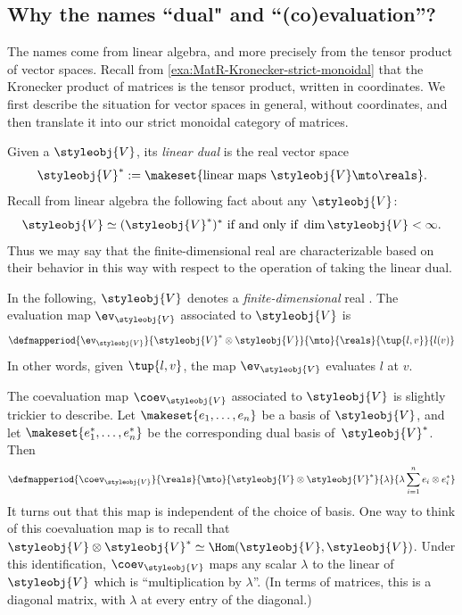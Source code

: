 \subsection{Why the names ``dual" and ``(co)evaluation''?}

The names come from linear algebra, and more precisely from the tensor product of vector spaces.
Recall from \cref{exa:MatR-Kronecker-strict-monoidal} that the Kronecker product of matrices is the tensor product, written in coordinates.
We first describe the situation for vector spaces in general, without coordinates, and then translate it into our strict monoidal category of matrices.

Given a  $\styleobj{V} $, its \emph{linear dual} is the real vector space
\begin{equation}
    \label{eq:lin-dual-vecsp}
    \styleobj{V} ^{*} := \makeset{ \text{linear maps } \styleobj{V} \mto \reals }.
\end{equation}
%
Recall from linear algebra the following fact about any  $\styleobj{V} $:
%
\begin{equation}
    \label{eq:double-dual-fin-dim}
    \styleobj{V} \simeq (\styleobj{V} ^{*})^* \text{ if and only if } \dim \styleobj{V} < \infty.
\end{equation}
%
Thus we may say that the finite-dimensional real  are characterizable based on their behavior in this way with respect to the operation of taking the linear dual. 


In the following, $\styleobj{V} $ denotes a \emph{finite-dimensional} real .
The evaluation map $\ev_\styleobj{V} $ associated to $\styleobj{V} $ is
\begin{equation}
    \label{eq:evaluation-vecsp}
    \defmapperiod{
        \ev_\styleobj{V}
    }{
        \styleobj{V}^* \otimes \styleobj{V}
    }{
        \mto
    }{
        \reals
    }{
        \tup{l, v}
    }{
        l(v)
    }
\end{equation}
In other words, given $\tup{l, v}$, the map $\ev_\styleobj{V} $ evaluates $l$ at $v$.

The coevaluation map $\coev_\styleobj{V} $ associated to $\styleobj{V} $ is slightly trickier to describe.
Let $\makeset{e_1, \dots, e_n }$ be a basis of $\styleobj{V}$, and let $\makeset{e_1^*, \dots, e_n^* }$ be the corresponding dual basis of~$\styleobj{V}^*$.
Then
\begin{equation}
    \label{eq:coevaluation-vecsp}
    \defmapperiod{
        \coev_\styleobj{V}
    }{
        \reals
    }{
        \mto
    }{
        \styleobj{V} \otimes \styleobj{V}^*
    }{
        \lambda
    }{
        \lambda \sum_{i=1}^n e_i \otimes e_i^*
    }
\end{equation}
It turns out that this map is independent of the choice of basis.
One way to think of this coevaluation map is to recall that $\styleobj{V} \otimes \styleobj{V}^* \simeq \Hom(\styleobj{V}, \styleobj{V})$.
Under this identification, $\coev_\styleobj{V}$ maps any scalar $\lambda$ to the linear  of $\styleobj{V}$ which is ``multiplication by $\lambda$''.
(In terms of matrices, this is a diagonal matrix, with $\lambda$ at every entry of the diagonal.)

